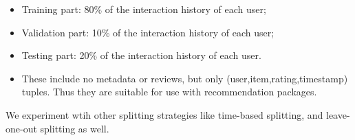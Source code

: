 \documentclass{article}
\begin{document}
\begin{enumerate}
\begin{itemize}
\begin{itemize}
                              \item Training part: 80\% of the interaction
                                    history of each user;
                              \item Validation part: 10\% of the interaction
                                    history of each user;
                              \item Testing part: 20\% of the interaction
                                    history of each user.
                              \item These include no metadata or reviews, but
                                    only
                                    (user,item,rating,timestamp) tuples. Thus
                                    they
                                    are suitable for use with
                                    recommendation packages.
                        \end{itemize}
                        We experiment wtih other splitting strategies like
                        time-based
                        splitting, and leave-one-out splitting as well.
            \end{itemize}


\end{enumerate}
\end{document}
